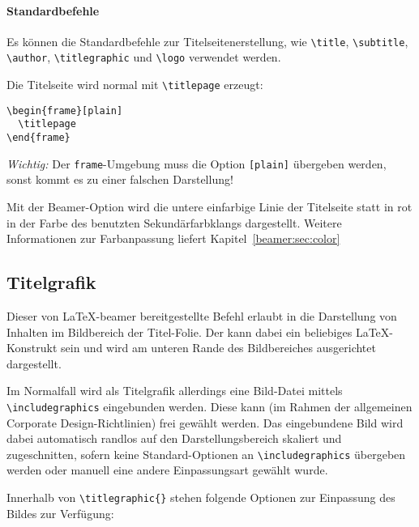 \paragraph{Standardbefehle}

Es können die Standardbefehle zur Titelseitenerstellung, wie
\lstinline{\title},
\lstinline{\subtitle},
\lstinline{\author},
\lstinline{\titlegraphic}
und \lstinline{\logo} verwendet werden.

Die Titelseite wird normal mit \lstinline{\titlepage} erzeugt:

\begin{lstlisting}
\begin{frame}[plain]
  \titlepage
\end{frame}
\end{lstlisting}

\emph{Wichtig:} Der \lstinline{frame}-Umgebung muss die Option
\lstinline{[plain]} übergeben werden,
sonst kommt es zu einer falschen Darstellung!

\begin{Declaration}
\end{Declaration}

Mit der Beamer-Option  wird die untere einfarbige Linie
der Titelseite statt in rot in der Farbe des benutzten Sekundärfarbklangs
dargestellt. Weitere Informationen zur Farbanpassung liefert
Kapitel~\ref{beamer:sec:color}


\subsection{Titelgrafik}

\begin{Declaration}
\end{Declaration}

\begin{sloppypar}
Dieser von \LaTeX-beamer bereitgestellte Befehl erlaubt in \tubslatex
die Darstellung von Inhalten im Bildbereich der Titel-Folie.
Der  kann dabei ein beliebiges \LaTeX-Konstrukt sein
und wird am unteren Rande des Bildbereiches ausgerichtet dargestellt.

Im Normalfall wird als Titelgrafik allerdings eine Bild-Datei mittels
\lstinline{\includegraphics} eingebunden werden.
Diese kann (im Rahmen der allgemeinen Corporate Design-Richtlinien)%
frei gewählt werden.
Das eingebundene Bild wird dabei automatisch randlos
auf den Darstellungsbereich skaliert und zugeschnitten, sofern keine
Standard-Optionen an \lstinline{\includegraphics} übergeben werden oder
manuell eine andere Einpassungsart gewählt wurde.

Innerhalb von \lstinline!\titlegraphic{}! stehen folgende
Optionen zur Einpassung des Bildes zur Verfügung:
\end{sloppypar}

